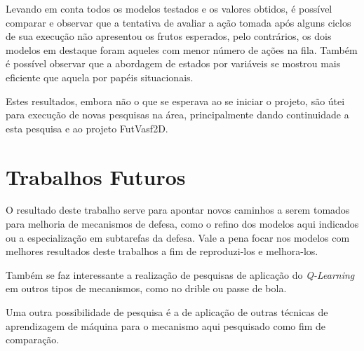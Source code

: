 Levando em conta todos os modelos testados e os valores obtidos, é possível
comparar e observar que a tentativa de avaliar a ação tomada após alguns ciclos
de sua execução não apresentou os frutos esperados, pelo contrários, os dois
modelos em destaque foram aqueles com menor número de ações na fila. Também é
possível observar que a abordagem de estados por variáveis se mostrou mais
eficiente que aquela por papéis situacionais.

Estes resultados, embora não o que se esperava ao se iniciar o projeto, são útei
para execução de novas pesquisas na área, principalmente dando continuidade a
esta pesquisa e ao projeto FutVasf2D.

\section{Trabalhos Futuros}\label{sec:future}

O resultado deste trabalho serve para apontar novos caminhos a serem tomados
para melhoria de mecanismos de defesa, como o refino dos modelos aqui indicados
ou a especialização em subtarefas da defesa. Vale a pena focar nos modelos com
melhores resultados deste trabalhos a fim de reproduzi-los e melhora-los.

Também se faz interessante a realização de pesquisas de aplicação do
\textit{Q-Learning} em outros tipos de mecanismos, como no drible ou passe de
bola.

Uma outra possibilidade de pesquisa é a de aplicação de outras técnicas de
aprendizagem de máquina para o mecanismo aqui pesquisado como fim de comparação.